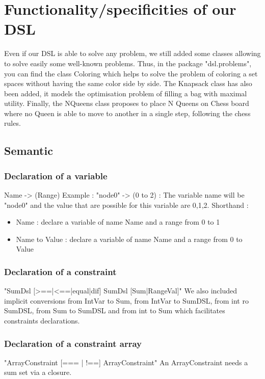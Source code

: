 




\linespread{0.30}
\section{Functionality/specificities of our DSL}
Even if our DSL is able to solve any problem, we still added some classes allowing to solve easily some well-known problems. Thus, in the package "dsl.problems", you can find the class Coloring which helps to solve the problem of coloring a set spaces without having the same color side by side. The Knapsack class has also been added, it models the optimisation problem of filling a bag with maximal utility. Finally, the NQueens class proposes to place N Queens on Chess board where no Queen is able to move to another in a single step, following the chess rules.
\subsection{Semantic}
\subsubsection{Declaration of a variable}
Name -> (Range)\newline
Example : "node0" -> (0 to 2) : The variable name will be "node0" and the value that are possible for this variable are {0,1,2}.\newline
Shorthand :
\begin{itemize}
\item Name : declare a variable of name Name and a range from 0 to 1
\item Name to Value : declare a variable of name Name and a range from 0 to Value
\end{itemize}
\subsubsection{Declaration of a constraint}
"SumDsl [>==|<==|equal|dif] SumDsl [Sum|RangeVal]"\newline
We also included implicit conversions from IntVar to Sum, from IntVar to SumDSL, from int ro SumDSL, from Sum to SumDSL and from int to Sum which facilitates constraints declarations.
\subsubsection{Declaration of a constraint array}
"ArrayConstraint [=== | !==] ArrayConstraint"\newline
An ArrayConstraint needs a sum set via a closure.
